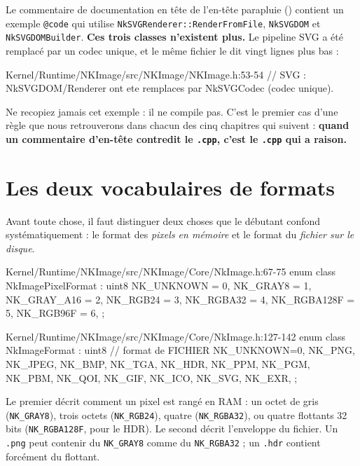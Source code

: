 \begin{nkpiege}
Le commentaire de documentation en tête de l'en-tête parapluie
() contient un
exemple \texttt{@code} qui utilise \texttt{NkSVGRenderer::RenderFromFile},
\texttt{NkSVGDOM} et \texttt{NkSVGDOMBuilder}. \textbf{Ces trois classes
n'existent plus.} Le pipeline SVG a été remplacé par un codec unique, et le même
fichier le dit vingt lignes plus bas :

\begin{nkcode}{Kernel/Runtime/NKImage/src/NKImage/NKImage.h:53-54}
// SVG : NkSVGDOM/Renderer ont ete remplaces par NkSVGCodec (codec unique).
\end{nkcode}

Ne recopiez jamais cet exemple : il ne compile pas. C'est le premier cas d'une
règle que nous retrouverons dans chacun des cinq chapitres qui suivent :
\textbf{quand un commentaire d'en-tête contredit le \texttt{.cpp}, c'est le
\texttt{.cpp} qui a raison.}
\end{nkpiege}

\section{Les deux vocabulaires de formats}

Avant toute chose, il faut distinguer deux choses que le débutant confond
systématiquement : le format des \emph{pixels en mémoire} et le format du
\emph{fichier sur le disque}.

\begin{nkcode}{Kernel/Runtime/NKImage/src/NKImage/Core/NkImage.h:67-75}
enum class NkImagePixelFormat : uint8 {
    NK_UNKNOWN = 0, NK_GRAY8 = 1, NK_GRAY_A16 = 2,
    NK_RGB24 = 3, NK_RGBA32 = 4, NK_RGBA128F = 5, NK_RGB96F = 6,
};
\end{nkcode}

\begin{nkcode}{Kernel/Runtime/NKImage/src/NKImage/Core/NkImage.h:127-142}
enum class NkImageFormat : uint8 {                    // format de FICHIER
    NK_UNKNOWN=0, NK_PNG, NK_JPEG, NK_BMP, NK_TGA, NK_HDR,
    NK_PPM, NK_PGM, NK_PBM, NK_QOI, NK_GIF, NK_ICO, NK_SVG, NK_EXR,
};
\end{nkcode}

Le premier décrit comment un pixel est rangé en RAM : un octet de gris
(\texttt{NK\_GRAY8}), trois octets (\texttt{NK\_RGB24}), quatre
(\texttt{NK\_RGBA32}), ou quatre flottants 32 bits
(\texttt{NK\_RGBA128F}, pour le HDR). Le second décrit l'enveloppe du fichier.
Un \texttt{.png} peut contenir du \texttt{NK\_GRAY8} comme du
\texttt{NK\_RGBA32} ; un \texttt{.hdr} contient forcément du flottant.

